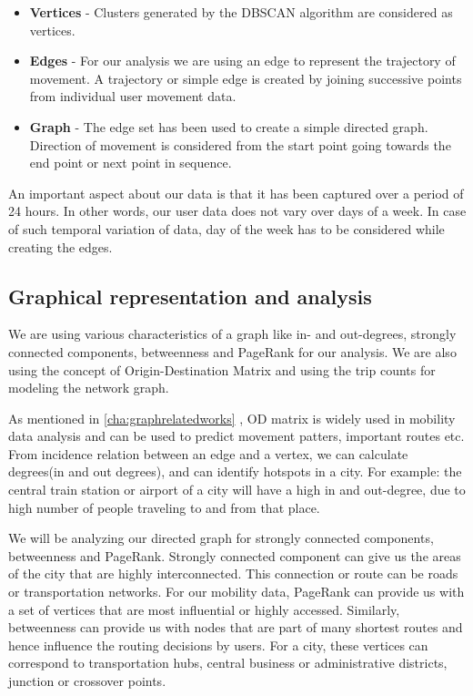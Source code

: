 \begin{itemize}  
	\item \textbf{Vertices} - Clusters generated by the DBSCAN algorithm are considered as vertices.
	\item \textbf{Edges} - For our analysis we are using an edge to represent the trajectory of movement. A trajectory or simple edge is created by joining successive points from individual user movement data. 
	\item \textbf{Graph} - The edge set has been used to create a simple directed graph. Direction of movement is considered from the start point going towards the end point or next point in sequence.
\end{itemize}

An important aspect about our data is that it has been captured over a period of 24 hours. In other words, our user data does not vary over days of a week. In case of such temporal variation of data, day of the week has to be considered while creating the edges.

\subsection{Graphical representation and analysis}
\label{cha:graph1}
 We are using various characteristics of a graph like in- and out-degrees, strongly connected components, betweenness and PageRank \cite{page1999pagerank} for our analysis. We are also using the concept of Origin-Destination Matrix and using the trip counts for modeling the network graph. 
 
 As mentioned in \autoref{cha:graphrelatedworks} , OD matrix is widely used in mobility data analysis and can be used to predict movement patters, important routes etc. From incidence relation between an edge and a vertex, we can calculate degrees(in and out degrees), and can identify hotspots in a city. For example: the central train station or airport of a city will have a high in and out-degree, due to high number of people traveling to and from that place.

 We will be analyzing our directed graph for strongly connected components, betweenness and PageRank. Strongly connected component can give us the areas of the city that are highly interconnected. This connection or route can be roads or transportation networks. For our mobility data, PageRank can provide us with a set of vertices that are most influential or highly accessed. Similarly, betweenness can provide us with nodes that are part of many shortest routes and hence influence the routing decisions by users. For a city, these vertices can correspond to transportation hubs, central business or administrative districts, junction or crossover points.

\FloatBarrier
\FloatBarrier